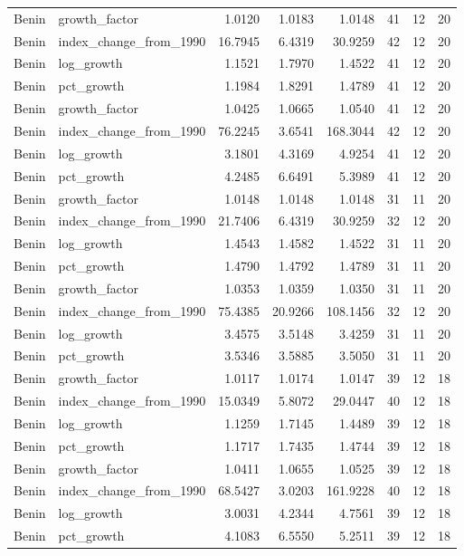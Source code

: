 \begin{table}
\begin{tabular}[t]{llrrrrrr}
Benin & growth\_factor & 1.0120 & 1.0183 & 1.0148 & 41 & 12 & 20\\
Benin & index\_change\_from\_1990 & 16.7945 & 6.4319 & 30.9259 & 42 & 12 & 20\\
Benin & log\_growth & 1.1521 & 1.7970 & 1.4522 & 41 & 12 & 20\\
Benin & pct\_growth & 1.1984 & 1.8291 & 1.4789 & 41 & 12 & 20\\
Benin & growth\_factor & 1.0425 & 1.0665 & 1.0540 & 41 & 12 & 20\\
\addlinespace
Benin & index\_change\_from\_1990 & 76.2245 & 3.6541 & 168.3044 & 42 & 12 & 20\\
Benin & log\_growth & 3.1801 & 4.3169 & 4.9254 & 41 & 12 & 20\\
Benin & pct\_growth & 4.2485 & 6.6491 & 5.3989 & 41 & 12 & 20\\
Benin & growth\_factor & 1.0148 & 1.0148 & 1.0148 & 31 & 11 & 20\\
Benin & index\_change\_from\_1990 & 21.7406 & 6.4319 & 30.9259 & 32 & 12 & 20\\
\addlinespace
Benin & log\_growth & 1.4543 & 1.4582 & 1.4522 & 31 & 11 & 20\\
Benin & pct\_growth & 1.4790 & 1.4792 & 1.4789 & 31 & 11 & 20\\
Benin & growth\_factor & 1.0353 & 1.0359 & 1.0350 & 31 & 11 & 20\\
Benin & index\_change\_from\_1990 & 75.4385 & 20.9266 & 108.1456 & 32 & 12 & 20\\
Benin & log\_growth & 3.4575 & 3.5148 & 3.4259 & 31 & 11 & 20\\
\addlinespace
Benin & pct\_growth & 3.5346 & 3.5885 & 3.5050 & 31 & 11 & 20\\
Benin & growth\_factor & 1.0117 & 1.0174 & 1.0147 & 39 & 12 & 18\\
Benin & index\_change\_from\_1990 & 15.0349 & 5.8072 & 29.0447 & 40 & 12 & 18\\
Benin & log\_growth & 1.1259 & 1.7145 & 1.4489 & 39 & 12 & 18\\
Benin & pct\_growth & 1.1717 & 1.7435 & 1.4744 & 39 & 12 & 18\\
\addlinespace
Benin & growth\_factor & 1.0411 & 1.0655 & 1.0525 & 39 & 12 & 18\\
Benin & index\_change\_from\_1990 & 68.5427 & 3.0203 & 161.9228 & 40 & 12 & 18\\
Benin & log\_growth & 3.0031 & 4.2344 & 4.7561 & 39 & 12 & 18\\
Benin & pct\_growth & 4.1083 & 6.5550 & 5.2511 & 39 & 12 & 18\\

\end{tabular}
\end{table}
